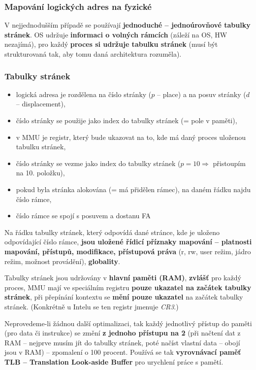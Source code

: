 \documentclass[a4paper, 11pt]{article}
\begin{document}
\subsubsection{Mapování logických adres na fyzické}
V nejjednodušším případě se používají \textbf{jednoduché -- jednoúrovňové tabulky stránek}. OS udržuje \textbf{informaci o volných rámcích} (záleží na OS, HW nezajímá), pro každý \textbf{proces si udržuje tabulku stránek} (musí být strukturovaná tak, aby tomu daná architektura rozuměla).
 
\subsubsection{Tabulky stránek}
\begin{itemize}
    \item logická adresa je rozdělena na číslo stránky ($p$ -- place) a na posuv stránky ($d$ -- displacement),
    \item číslo stránky se použije jako index do tabulky stránek (= pole v paměti),
    \item v MMU je registr, který bude ukazovat na to, kde má daný proces uloženou tabulku stránek,
    \item číslo stránky se vezme jako index do tabulky stránek ($p=10 \Rightarrow$ přistoupím na 10. položku),
    \item pokud byla stránka alokována (= má přidělen rámec), na daném řádku najdu číslo rámce,
    \item číslo rámce se spojí s posuvem a dostanu FA
\end{itemize}
 
Na řádku tabulky stránek, který odpovídá dané stránce, kde je uloženo odpovídající číslo rámce, \textbf{jsou uložené řídicí příznaky mapování -- platnosti mapování, přístupů, modifikace, přístupová práva} (r, rw, user režim, jádro režim, možnost provádění), \textbf{globality}.
 
Tabulky stránek jsou udržovány v \textbf{hlavní paměti (RAM)}, \textbf{zvlášť} pro každý proces, MMU mají ve speciálním registru \textbf{pouze ukazatel na začátek tabulky stránek}, při přepínání kontextu se \textbf{mění pouze ukazatel} na začátek tabulky stránek. (Konkrétně u Intelu se ten registr jmenuje \emph{CR3}.)
 
Neprovedeme-li žádnou další optimalizaci, tak každý jednotlivý přístup do paměti (pro data či instrukce) se změní \textbf{z jednoho přístupu na 2} (při načtení dat z RAM -- nejprve musím jít do tabulky stránek, poté načíst vlastní data -- obojí jsou v RAM) -- zpomalení o 100 procent. Používá se tak \textbf{vyrovnávací paměť TLB -- Translation Look-aside Buffer} pro urychlení práce s pamětí.
\end{document}
